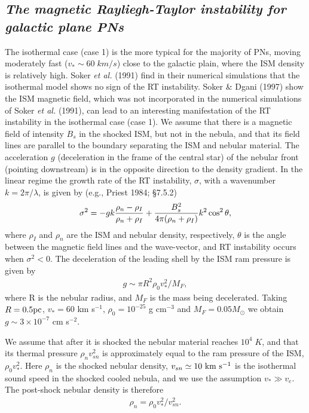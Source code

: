 \subsection {\it The magnetic Rayliegh-Taylor instability for galactic plane PNs}
The isothermal case (case 1) is the more typical for the majority of PNs,
moving moderately fast ($v_\ast\sim 60\;km/s$) close to the galactic plain,
where the ISM density is relatively high.
Soker {\it et al.} (1991) find in their numerical simulations that the
isothermal model shows no sign of the RT instability.
Soker \& Dgani (1997) show   the ISM magnetic field, which was not incorporated in
the numerical simulations of Soker {\it et al.} (1991), can lead to an
interesting manifestation of the RT instability in the isothermal case  (case 1).
We assume that there is a magnetic field of intensity $B_s$ in the shocked
ISM, but not in the nebula, and that its field lines are parallel to the
boundary separating the ISM and nebular material.
The acceleration $g$ (deceleration in the frame of the central star)
of the nebular front (pointing downstream) is in the opposite
direction to the density gradient.
In the linear regime the growth rate of the RT instability, $\sigma$, with a
wavenumber $k = 2 \pi / \lambda$, is given by  (e.g., Priest 1984; \S 7.5.2)
\begin{eqnarray}
\sigma^2 = - g k {
{\rho_n-\rho_I}
\over
{\rho_n+\rho_I}}
+
{{B_s^2}\over{4 \pi ( \rho_n+\rho_I )}}
k^2 \cos^2 \theta,
\end{eqnarray}
 where $\rho_I$ and $\rho_n$ are the ISM and nebular density, respectively,
$\theta$ is the angle between the magnetic field lines and the
wave-vector, and RT instability occurs when $\sigma^2 < 0$.
The deceleration of the leading shell
{ { by the ISM ram pressure}} is given by
\begin{eqnarray}
g\sim \pi R^2 \rho_0 v_\ast^2/M_F,
\end{eqnarray}
where R is the nebular radius, and $M_F$ is the mass being decelerated.
Taking $R=0.5 \rm{pc}$, $v_\ast=60$ km s$^{-1}$, $\rho_0= 10^{-25}$ g cm$^{-3}$ and
$M_F=0.05 M_\odot$
we obtain $g \sim 3\times 10^{-7}$ cm  s$^{-2}$.


We assume that after it is shocked the nebular material reaches
$10^4\;K$, and that its thermal pressure $\rho_n v_{sn}^2$ is approximately
equal to the ram pressure of the ISM,  $\rho_0 v_\ast^2$.
 Here $\rho_{n}$ is the shocked nebular density,
$v_{sn} \simeq 10 ~\rm{km} ~\rm{s}^{-1}$ is the isothermal sound speed in the
shocked cooled nebula, and we use the assumption $v_\ast \gg v_e$.
 The post-shock nebular density is therefore
\begin{eqnarray}
\rho_{n} = \rho_0 v_\ast^2/ v_{sn}^2.
\end{eqnarray}

